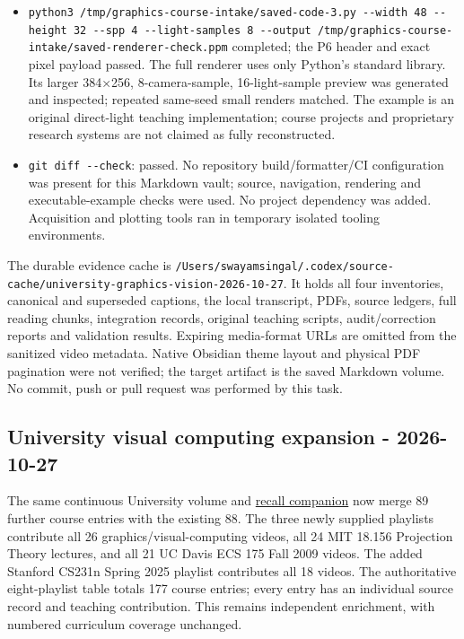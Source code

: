 \begin{itemize}
\item
  \texttt{python3\ /tmp/graphics-course-intake/saved-code-3.py\ -\/-width\ 48\ -\/-height\ 32\ -\/-spp\ 4\ -\/-light-samples\ 8\ -\/-output\ /tmp/graphics-course-intake/saved-renderer-check.ppm} completed; the P6 header and exact pixel payload passed. The full renderer uses only Python's standard library. Its larger 384×256, 8-camera-sample, 16-light-sample preview was generated and inspected; repeated same-seed small renders matched. The example is an original direct-light teaching implementation; course projects and proprietary research systems are not claimed as fully reconstructed.
\item
  \texttt{git\ diff\ -\/-check}: passed. No repository build/formatter/CI configuration was present for this Markdown vault; source, navigation, rendering and executable-example checks were used. No project dependency was added. Acquisition and plotting tools ran in temporary isolated tooling environments.
\end{itemize}

The durable evidence cache is \texttt{/Users/swayamsingal/.codex/source-cache/university-graphics-vision-2026-10-27}. It holds all four inventories, canonical and superseded captions, the local transcript, PDFs, source ledgers, full reading chunks, integration records, original teaching scripts, audit/correction reports and validation results. Expiring media-format URLs are omitted from the sanitized video metadata. Native Obsidian theme layout and physical PDF pagination were not verified; the target artifact is the saved Markdown volume. No commit, push or pull request was performed by this task.

\subsection{University visual computing expansion - 2026-10-27}\label{appendix-a103e7846d21-university-visual-computing-expansion---2026-10-27}

The same {continuous University volume} and \hyperref[appendix-a8f634b076b5]{recall companion} now merge 89 further course entries with the existing 88. The three newly supplied playlists contribute all 26 graphics/visual-computing videos, all 24 MIT 18.156 Projection Theory lectures, and all 21 UC Davis ECS 175 Fall 2009 videos. The added Stanford CS231n Spring 2025 playlist contributes all 18 videos. The authoritative eight-playlist table totals 177 course entries; every entry has an individual source record and teaching contribution. This remains independent enrichment, with numbered curriculum coverage unchanged.

